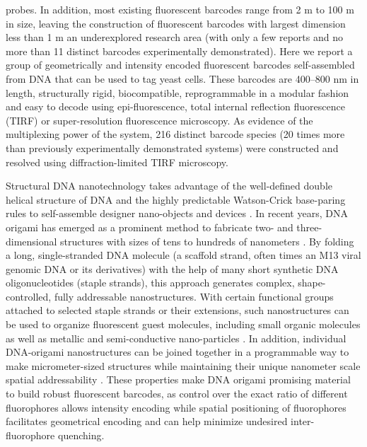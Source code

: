 probes. In addition, most existing fluorescent barcodes range from 2 \textmu m to 100 \textmu m in 
size, leaving the construction of fluorescent barcodes with largest dimension less than 1 
\textmu m an underexplored research area (with only a few reports  \citep{li_multiplexed_2005,lin_self-assembled_2007,li_controlled_2010,levsky_single-cell_2002} and no more than 11 
distinct barcodes experimentally demonstrated). Here we report a group of geometrically and intensity 
encoded fluorescent barcodes self-assembled from DNA that can be used to tag yeast 
cells. These barcodes are 400–800 nm in length, structurally rigid, biocompatible, 
reprogrammable in a modular fashion and easy to decode using epi-fluorescence, total internal reflection fluorescence (TIRF) or 
super-resolution fluorescence microscopy. As evidence of the multiplexing power of the 
system, 216 distinct barcode species (20 times more than previously experimentally 
demonstrated systems) were constructed and resolved using diffraction-limited TIRF 
microscopy. 

Structural DNA nanotechnology takes advantage of the well-defined double 
helical structure of DNA and the highly predictable Watson-Crick base-paring rules to 
self-assemble designer nano-objects and devices \citep{seeman_nucleic_1982,aldaye_assembling_2008,lin_designer_2009,nangreave_dna_2010,shih_knitting_2010,trring_dna_2011}. In recent years, DNA origami has 
emerged as a prominent method to fabricate two- and three-dimensional structures with 
sizes of tens to hundreds of nanometers \citep{rothemund_folding_2006,douglas_self-assembly_2009,dietz_folding_2009,ke_multilayer_2009,andersen_self-assembly_2009,han_folding_2010,liedl_self-assembly_2010,han_dna_2011}. By folding a long, single-stranded DNA 
molecule (a scaffold strand, often times an M13 viral genomic DNA or its derivatives) 
with the help of many short synthetic DNA oligonucleotides (staple strands), this 
approach generates complex, shape-controlled, fully addressable nanostructures. With 
certain functional groups attached to selected staple strands or their extensions, such 
nanostructures can be used to organize fluorescent guest molecules, including small 
organic molecules \citep{jungmann_single-molecule_2010,steinhauer_dna_2009,lund_molecular_2010} as well as metallic \citep{pal_dna-origami-directed_2010} and semi-conductive nano-particles \citep{bui_programmable_2010}. In 
addition, individual DNA-origami nanostructures can be joined together in a 
programmable way to make micrometer-sized structures while maintaining their unique 
nanometer scale spatial addressability \citep{liu_crystalline_2011,woo_programmable_2011}. These properties make DNA origami 
promising material to build robust fluorescent barcodes, as control over the exact ratio of 
different fluorophores allows intensity encoding while spatial positioning of fluorophores 
facilitates geometrical encoding and can help minimize undesired inter-fluorophore 
quenching. 

